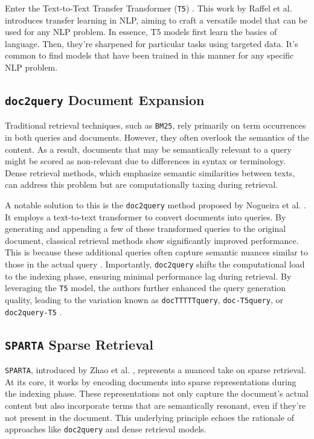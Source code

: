 \documentclass[sigconf]{acmart}
\begin{document}
Enter the Text-to-Text Transfer Transformer (\texttt{T5}) \cite{raffel2020exploring}. This work by Raffel et al. introduces transfer learning in NLP, aiming to craft a versatile model that can be used for any NLP problem. In essence, T5 models first learn the basics of language. Then, they're sharpened for particular tasks using targeted data. It's common to find models that have been trained in this manner for any specific NLP problem.

\subsection*{\texttt{doc2query} Document Expansion}\label{sec:doc2query}
Traditional retrieval techniques, such as \texttt{BM25}, rely primarily on term occurrences in both queries and documents. However, they often overlook the semantics of the content. As a result, documents that may be semantically relevant to a query might be scored as non-relevant due to differences in syntax or terminology. Dense retrieval methods, which emphasize semantic similarities between texts, can address this problem but are computationally taxing during retrieval.

A notable solution to this is the \texttt{doc\-2query} method proposed by Nogueira et al. \cite{nogueira2019document}. It employs a text-to-text transformer to convert documents into queries. By generating and appending a few of these transformed queries to the original document, classical retrieval methods show significantly improved performance. This is because these additional queries often capture semantic nuances similar to those in the actual query \cite{nogueira2019document,nogueira2019doc2query,pradeep2021expando}. Importantly, \texttt{doc\-2query} shifts the computational load to the indexing phase, ensuring minimal performance lag during retrieval. By leveraging the \texttt{T5} model, the authors further enhanced the query generation quality, leading to the variation known as \texttt{doc\-TTTTTquery}, \texttt{doc\--T5query}, or \texttt{doc\-2query\--T5} \cite{nogueira2019doc2query}.

\subsection*{\texttt{SPARTA} Sparse Retrieval}\label{sec:sparta}
\texttt{SPARTA}, introduced by Zhao et al. \cite{zhao2020sparta}, represents a nuanced take on sparse retrieval. At its core, it works by encoding documents into sparse representations during the indexing phase. These representations not only capture the document's actual content but also incorporate terms that are semantically resonant, even if they're not present in the document. This underlying principle echoes the rationale of approaches like \texttt{doc2query} and dense retrieval models.
\end{document}
